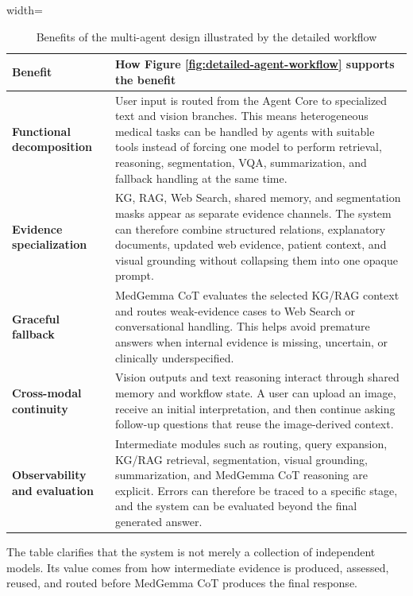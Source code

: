 \begin{table}[H]
\centering
\begin{adjustbox}{width=\textwidth}
\begin{tabular}{>{\RaggedRight\arraybackslash}p{} >{\RaggedRight\arraybackslash}p{}}
\hline\hline
\textbf{Benefit} & \textbf{How Figure \ref{fig:detailed-agent-workflow} supports the benefit} \\
\hline
\textbf{Functional decomposition} & User input is routed from the Agent Core to specialized text and vision branches. This means heterogeneous medical tasks can be handled by agents with suitable tools instead of forcing one model to perform retrieval, reasoning, segmentation, VQA, summarization, and fallback handling at the same time. \\
\textbf{Evidence specialization} & KG, RAG, Web Search, shared memory, and segmentation masks appear as separate evidence channels. The system can therefore combine structured relations, explanatory documents, updated web evidence, patient context, and visual grounding without collapsing them into one opaque prompt. \\
\textbf{Graceful fallback} & MedGemma CoT evaluates the selected KG/RAG context and routes weak-evidence cases to Web Search or conversational handling. This helps avoid premature answers when internal evidence is missing, uncertain, or clinically underspecified. \\
\textbf{Cross-modal continuity} & Vision outputs and text reasoning interact through shared memory and workflow state. A user can upload an image, receive an initial interpretation, and then continue asking follow-up questions that reuse the image-derived context. \\
\textbf{Observability and evaluation} & Intermediate modules such as routing, query expansion, KG/RAG retrieval, segmentation, visual grounding, summarization, and MedGemma CoT reasoning are explicit. Errors can therefore be traced to a specific stage, and the system can be evaluated beyond the final generated answer. \\
\hline\hline
\end{tabular}
\end{adjustbox}
\caption{Benefits of the multi-agent design illustrated by the detailed workflow}
\label{table:multi-agent-benefits}
\end{table}

The table clarifies that the system is not merely a collection of independent models. Its value comes from how intermediate evidence is produced, assessed, reused, and routed before MedGemma CoT produces the final response.

